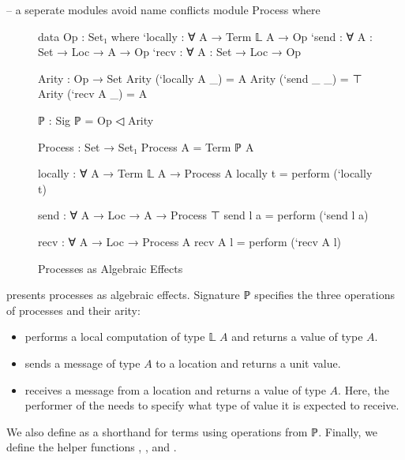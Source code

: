 \begin{code}[hide]
-- a seperate modules avoid name conflicts
module Process where
\end{code}

\begin{figure}[ht]

\begin{minipage}{.45\textwidth}
  \begin{center}\begin{code}
  data Op : Set₁ where
    `locally : ∀ {A} → Term 𝕃 A → Op
    `send    : ∀ {A : Set} → Loc → A → Op
    `recv    : ∀ {A : Set} → Loc → Op

  Arity : Op → Set
  Arity (`locally {A} _) = A
  Arity (`send _ _) = ⊤
  Arity (`recv {A} _) = A

  ℙ : Sig
  ℙ = Op ◁ Arity
  \end{code}\end{center}
\end{minipage}
\hfill\vline\hfill
\begin{minipage}{.45\textwidth}
  \begin{center}\begin{code}
  Process : Set → Set₁
  Process A = Term ℙ A

  locally : ∀ {A} → Term 𝕃 A → Process A
  locally t = perform (`locally t)

  send : ∀ {A} → Loc → A → Process ⊤
  send l a = perform (`send l a)

  recv : ∀ {A} → Loc → Process A
  recv {A} l = perform (`recv {A} l)
  \end{code}\end{center}
\end{minipage}

\caption{Processes as Algebraic Effects}
\label{fig:process}
\end{figure}

 presents processes as algebraic effects.
%
Signature ℙ specifies the three operations of processes and their arity:
%
\begin{itemize}
\item
   performs a local computation of type  𝕃 $A$ and returns a value of type $A$.
\item
   sends a message of type $A$ to a location and returns a unit value.
\item
   receives a message from a location and returns a value of type $A$.
  Here, the performer of the  needs to specify what type of value it is expected to receive.
\end{itemize}
%
We also define  as a shorthand for terms using operations from ℙ. Finally, we define the helper functions , , and .

